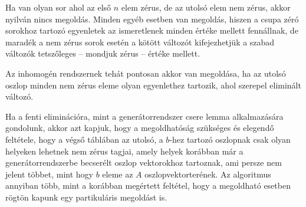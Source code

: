 \documentclass[9pt, a4paper, showtrims]{memoir}
\theoremstyle{plain}
\theoremstyle{remark}
\theoremstyle{definition}
\begin{document}
Ha van olyan sor ahol az első $n$ elem zérus, de az utolsó elem nem zérus, 
akkor nyilván nincs megoldás.
Minden egyéb esetben van megoldás, 
hiszen a csupa zéró sorokhoz tartozó egyenletek az ismeretlenek minden értéke mellett fennállnak,
de maradék a nem zérus sorok esetén a kötött változót
kifejezhetjük a szabad változók tetszőleges -- mondjuk zérus -- értéke mellett.

Az inhomogén rendszernek tehát pontosan akkor van megoldása, 
ha az utolsó oszlop minden nem zérus eleme olyan egyenlethez tartozik, 
ahol szerepel eliminált változó.

Ha a fenti eliminációra, mint a generátorrendszer csere lemma alkalmazására gondolunk,
akkor azt kapjuk, hogy a megoldhatóság szükséges és elegendő feltétele,
hogy a végső táblában az utolsó, a $b$-hez tartozó oszlopnak csak olyan helyeken lehetnek nem zérus tagjai,
amely helyek korábban már a generátorrendszerbe becserélt oszlop vektorokhoz tartoznak,
ami persze nem jelent többet, mint hogy $b$ eleme az $A$ oszlopvektorterének.
Az algoritmus annyiban több, mint a korábban megértett feltétel, 
hogy a megoldható esetben rögtön kapunk egy partikuláris megoldást is.
\end{document}
